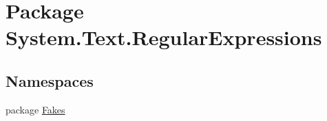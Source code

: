 \hypertarget{namespace_system_1_1_text_1_1_regular_expressions}{\section{Package System.\-Text.\-Regular\-Expressions}
\label{namespace_system_1_1_text_1_1_regular_expressions}
}
\subsection*{Namespaces}
\begin{DoxyCompactItemize}
\item 
package \hyperlink{namespace_system_1_1_text_1_1_regular_expressions_1_1_fakes}{Fakes}
\end{DoxyCompactItemize}
